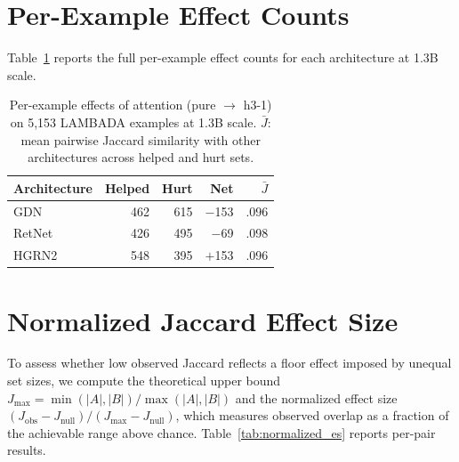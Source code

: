\section{Per-Example Effect Counts}\label{app:per_example_counts}

Table~\ref{tab:per_example} reports the full per-example effect counts for each architecture at 1.3B scale.

\begin{table}[ht]
\centering
\caption{Per-example effects of attention (pure $\to$ h3-1) on 5{,}153 LAMBADA examples at 1.3B scale. $\bar{J}$: mean pairwise Jaccard similarity with other architectures across helped and hurt sets.}
\label{tab:per_example}
\begin{tabular}{lrrrr}
\toprule
Architecture & Helped & Hurt & Net & $\bar{J}$ \\
\midrule
GDN & 462 & 615 & $-$153 & .096 \\
RetNet & 426 & 495 & $-$69 & .098 \\
HGRN2 & 548 & 395 & $+$153 & .096 \\
\bottomrule
\end{tabular}
\end{table}

\section{Normalized Jaccard Effect Size}\label{app:normalized_es}

To assess whether low observed Jaccard reflects a floor effect imposed by unequal set sizes, we compute the theoretical upper bound $J_{\max} = \min(|A|,|B|) / \max(|A|,|B|)$ and the normalized effect size $(J_{\text{obs}} - J_{\text{null}}) / (J_{\max} - J_{\text{null}})$, which measures observed overlap as a fraction of the achievable range above chance. Table~\ref{tab:normalized_es} reports per-pair results.

